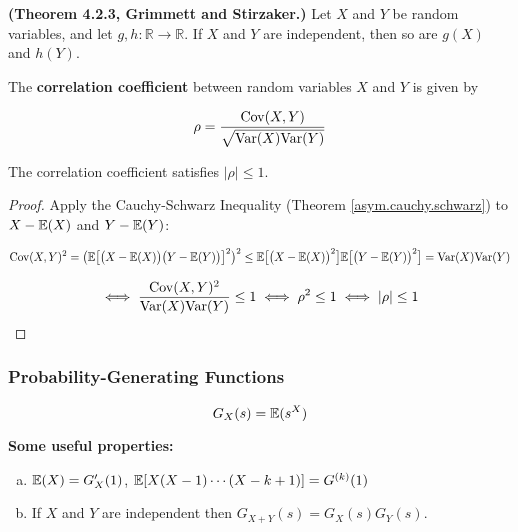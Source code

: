 \begin{theorem} \textbf{(Theorem 4.2.3, Grimmett and Stirzaker.)} Let \(X\) and \(Y\) be random variables, and let \(g, h: \mathbb{R} \to \mathbb{R}\). If \(X\) and \(Y\) are independent, then so are \(g(X)\) and \(h(Y)\). \end{theorem}

\begin{definition}The \textbf{correlation coefficient} between random variables \(X\) and \(Y\) is given by

\[
\rho = \frac{\Cov(X,Y)}{\sqrt{\Var(X) \Var(Y)}}
\]
\end{definition}

\begin{theorem}The correlation coefficient satisfies \(|\rho| \leq 1\).\end{theorem}

\begin{proof}
Apply the Cauchy-Schwarz Inequality (Theorem \ref{asym.cauchy.schwarz})  to \(X - \E(X)\) and \(Y - \E(Y)\):

\[
\Cov(X,Y)^2 = \big(\E\big[\big(X - \E(X) \big) \big(Y - \E(Y) \big) \big]^2\big)^2 \leq \E \big[\big(X - \E(X) \big)^2 \big]\E \big[ \big(Y - \E(Y) \big) ^2\big] = \Var(X) \Var(Y) 
\]

\[
\iff \frac{\Cov(X,Y)^2}{\Var(X) \Var(Y) } \leq 1 \iff \rho^2 \leq 1 \iff |\rho| \leq 1
\]

\end{proof}

\subsubsection{Probability-Generating Functions}

\begin{definition}

\[
G_X(s) = \E(s^X) 
\]

\end{definition}

\begin{theorem} \textbf{Some useful properties:}

\begin{enumerate}[(a)]

\item \(\E(X) = G_X'(1)\), \(\E[X(X-1)\cdots(X - k +1)] = G^{(k)}(1)\)

\item If \(X\) and \(Y\) are independent then \(G_{X +Y}(s) = G_X(s) G_Y(s)\).

\end{enumerate}
\end{theorem}

